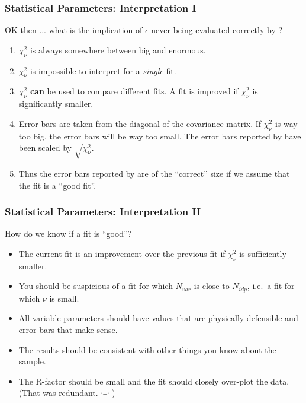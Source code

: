 \documentclass[10pt, xcolor=x11names, compress]{beamer}
\begin{document}
\begin{frame}
  \frametitle{Statistical Parameters: Interpretation I}

  \begin{exampleblock}{}
    OK then ... what is the implication of $\epsilon$ never being
    evaluated correctly by {\ifeffit}?
  \end{exampleblock}

  \begin{enumerate}[<+->]
  \item $\chi^2_\nu$ is always somewhere between big and enormous.
  \item $\chi^2_\nu$ is impossible to interpret for a \textit{single} fit.
  \item $\chi^2_\nu$ {\color{Green4}\textbf{can}} be used to compare
    different fits.  A fit is improved if $\chi^2_\nu$ is
    significantly smaller.
  \item Error bars are taken from the diagonal of the covariance
    matrix.  If $\chi^2_\nu$ is way too big, the error bars will be way
    too small.  The error bars reported by {\ifeffit} have been scaled
    by $\sqrt{\chi^2_\nu}$.
  \item Thus the error bars reported by {\ifeffit} are of the
    {\color{Green4}``correct''} size if we assume that the fit
    is a {\color{Green4}``good fit''}.
  \end{enumerate}
\end{frame}

\begin{frame}
  \frametitle{Statistical Parameters: Interpretation II}

  \begin{exampleblock}{}
    \begin{center}
      How do we know if a fit is ``good''?
    \end{center}
  \end{exampleblock}
  \begin{itemize}[<+->]
  \item The current fit is an improvement over the previous fit if
    $\chi^2_\nu$ is sufficiently smaller.
  \item You should be suspicious of a fit for which $N_{var}$ is close
    to $N_{idp}$, i.e.\ a fit for which $\nu$ is small.
  \item All variable parameters should have values that are physically
    defensible and error bars that make sense.
  \item The results should be consistent with other things you know
    about the sample.
  \item The R-factor should be small and the fit should closely
    over-plot the data.  (That was redundant. $\ddot\smile$ )
  \end{itemize}
\end{frame}
\end{document}
